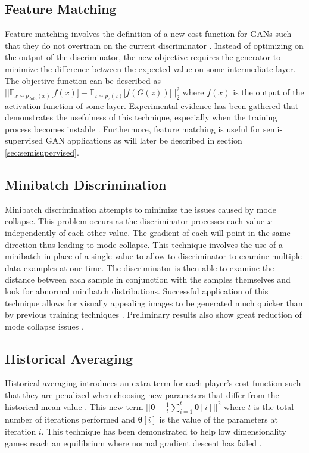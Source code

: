 \documentclass[11pt]{article}
\begin{document}
\subsection{Feature Matching}
Feature matching involves the definition of a new cost function for GANs such that they do not overtrain on the current discriminator \citep{2016arXiv160603498S}. Instead of optimizing on the output of the discriminator, the new objective requires the generator to minimize the difference between the expected value on some intermediate layer. The objective function can be described as $\Big|\Big|\mathbb{E}_{x\sim p_{data}(x)}\Big[f(x)\Big] - \mathbb{E}_{z\sim p_{z}(z)}\Big[f(G(z))\Big]\Big|\Big|_2^2$ where $f(x)$ is the output of the activation function of some layer. Experimental evidence has been gathered that demonstrates the usefulness of this technique, especially when the training process becomes instable \citep{2016arXiv160603498S}. Furthermore, feature matching is useful for semi-supervised GAN applications as will later be described in section \ref{sec:semisupervised}.

\subsection{Minibatch Discrimination}
Minibatch discrimination attempts to minimize the issues caused by mode collapse. This problem occurs as the discriminator processes each value $x$ independently of each other value. The gradient of each will point in the same direction thus leading to mode collapse. This technique involves the use of a minibatch in place of a single value to allow to discriminator to examine multiple data examples at one time. The discriminator is then able to examine the distance between each sample in conjunction with the samples themselves and look for abnormal minibatch distributions. Successful application of this technique allows for visually appealing images to be generated much quicker than by previous training techniques \citep{2016arXiv160603498S}. Preliminary results also show great reduction of mode collapse issues \citep{2017arXiv170100160G}.

\subsection{Historical Averaging}
Historical averaging introduces an extra term for each player's cost function such that they are penalized when choosing new parameters that differ from the historical mean value \citep{2016arXiv160603498S}. This new term $||\bm{\theta} - \frac{1}{t}\sum_{i=1}^{t}\bm{\theta}[i]||^2$ where $t$ is the total number of iterations performed and $\bm{\theta}[i]$ is the value of the parameters at iteration $i$. This technique has been demonstrated to help low dimensionality games reach an equilibrium where normal gradient descent has failed \citep{2016arXiv160603498S}.
\end{document}
